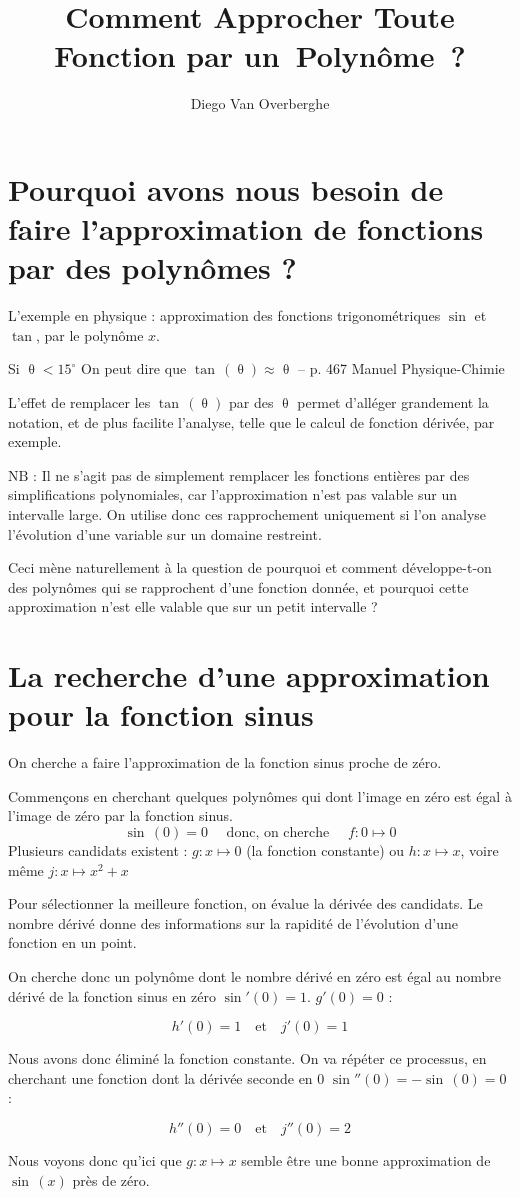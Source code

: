 \documentclass[DIV=12]{scrartcl}
\title{Comment Approcher Toute Fonction par un~Polynôme~?}
\author{Diego Van Overberghe}
\begin{document}
    \maketitle
    \section*{Pourquoi avons nous besoin de faire l'approximation de fonctions par des polynômes ?}
    L'exemple en physique : approximation des fonctions trigonométriques $\sin$ et $\tan$, par le polynôme $x$.
    \begin{center}
        \og Si $\uptheta<15^{\circ}$ On peut dire que $\tan\,(\uptheta)\approx\uptheta$ \fg{}\quad -- p. 467 Manuel Physique-Chimie
    \end{center}
    L'effet de remplacer les $\tan\,(\uptheta)$ par des $\uptheta$ permet d'alléger grandement la notation, et de plus facilite l'analyse, telle que le calcul de fonction dérivée, par exemple. 

    $\mathrm{N}\mathrm{B}$ : Il ne s'agit pas de simplement remplacer les fonctions entières par des simplifications polynomiales, car l'approximation n'est pas valable sur un intervalle large. On  utilise donc ces rapprochement uniquement si l'on analyse l'évolution d'une variable sur un domaine restreint.

    Ceci mène naturellement à la question de pourquoi et comment développe-t-on des polynômes qui se rapprochent d'une fonction donnée, et pourquoi cette approximation n'est elle valable que sur un petit intervalle ?

    \section*{La recherche d'une approximation pour la fonction sinus}
    On cherche a faire l'approximation de la fonction sinus proche de zéro.
    
    Commençons en cherchant quelques polynômes qui dont l'image en zéro est égal à l'image de zéro par la fonction sinus. 
    \[\sin\,(0)=0\quad\text{ donc, on cherche }\quad f:0\mapsto 0\]
    Plusieurs candidats existent : $g:x\mapsto 0$ (la fonction constante) ou $h:x\mapsto x$, voire même $j:x\mapsto x^2+x$
    
    Pour sélectionner la meilleure fonction, on évalue la dérivée des candidats. Le nombre dérivé donne des informations sur la rapidité de l'évolution d'une fonction en un point.
    
    On cherche donc un polynôme dont le nombre dérivé en zéro est égal au nombre dérivé de la fonction sinus en zéro $\sin'(0)=1$. $g'(0)=0$ :
    
    \[h'(0)=1\quad\text{et}\quad j'(0)=1\]

    Nous avons donc éliminé la fonction constante. On va répéter ce processus, en cherchant une fonction dont la dérivée seconde en 0 $\sin''(0)=-\sin\,(0)=0$ :
    
    \[h''(0)=0\quad\text{et}\quad j''(0)=2\]

    Nous voyons donc qu'ici que $g:x\mapsto x$ semble être une bonne approximation de~$\sin\,(x)$ près de zéro.
\end{document}
